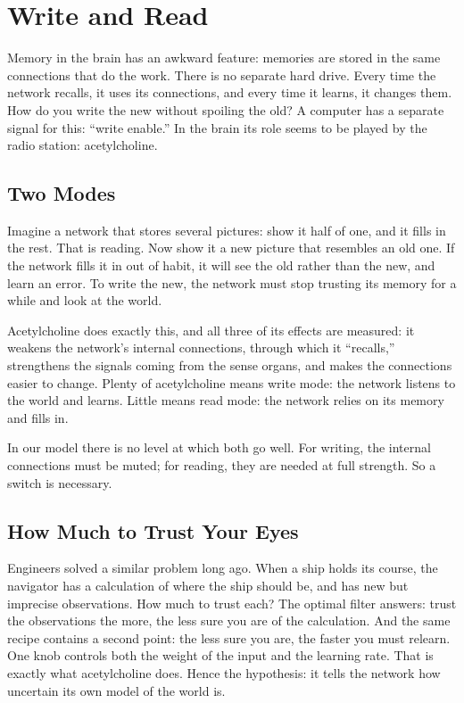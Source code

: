 \chapter{Write and Read}

Memory in the brain has an awkward feature: memories are stored in the same connections that do the work. There is no separate hard drive. Every time the network recalls, it uses its connections, and every time it learns, it changes them. How do you write the new without spoiling the old? A computer has a separate signal for this: ``write enable.'' In the brain its role seems to be played by the  radio station: acetylcholine.

\section*{Two Modes}

Imagine a network that stores several pictures: show it half of one, and it fills in the rest. That is reading. Now show it a new picture that resembles an old one. If the network fills it in out of habit, it will see the old rather than the new, and learn an error. To write the new, the network must stop trusting its memory for a while and look at the world.


Acetylcholine does exactly this, and all three of its effects are measured: it weakens the network's internal connections, through which it ``recalls,'' strengthens the signals coming from the sense organs, and makes the connections easier to change. Plenty of acetylcholine means write mode: the network listens to the world and learns. Little means read mode: the network relies on its memory and fills in.

In our model there is no level at which both go well. For writing, the internal connections must be muted; for reading, they are needed at full strength. So a switch is necessary.

\section*{How Much to Trust Your Eyes}

Engineers solved a similar problem long ago. When a ship holds its course, the navigator has a calculation of where the ship should be, and has new but imprecise observations. How much to trust each? The optimal filter answers: trust the observations the more, the less sure you are of the calculation. And the same recipe contains a second point: the less sure you are, the faster you must relearn. One knob controls both the weight of the input and the learning rate. That is exactly what acetylcholine does. Hence the hypothesis: it tells the network how uncertain its own model of the world is.

